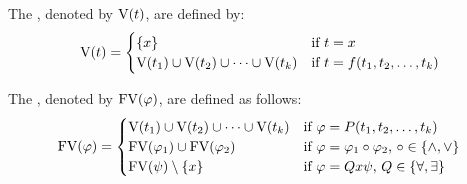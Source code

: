 \begin{definition}
	The , denoted by $\text{V}(t)$, are defined by:
	\[\V(t)=
		\begin{cases}
			\{x\}                                    & \text{if $t=x$}                    \\ %
			\V(t_1)\cup \V(t_2)\cup\dots\cup \V(t_k) & \text{if $t=f(t_1,t_2,\dots,t_k)$} 
		\end{cases}\]
	
	The , denoted by $\text{FV}(\varphi)$, are defined as follows:
	\[\FV(\varphi)=
		\begin{cases} %
			\V(t_1)\cup \V(t_2)\cup\dots\cup \V(t_k) & \text{if $\varphi=P(t_1,t_2,\dots,t_k)$}                               \\
			\FV(\varphi_1)\cup\FV(\varphi_2)         & \text{if $\varphi=\varphi_1\circ\varphi_2$, $\circ\in\{\wedge,\vee\}$} \\
			\FV(\psi)\setminus\{x\}                  & \text{if $\varphi=Q x\psi$, $Q\in\{\forall,\exists\}$}                 
		\end{cases}\]
\end{definition}

